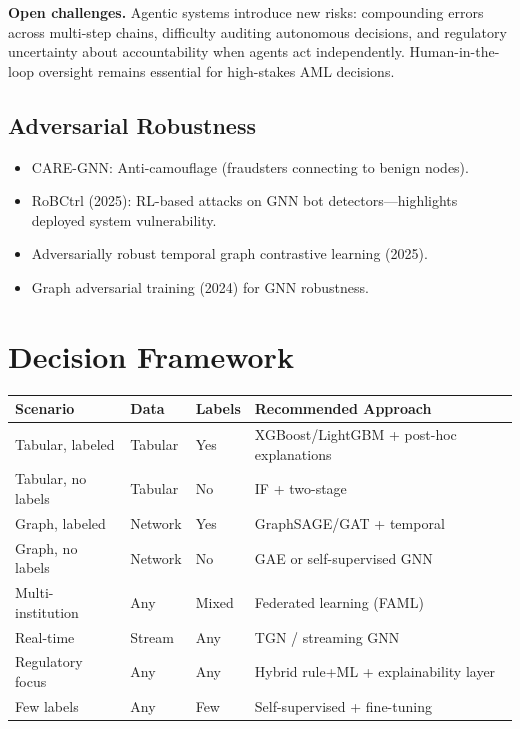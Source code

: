 \documentclass[11pt]{article}
\begin{document}
\textbf{Open challenges.} Agentic systems introduce new risks: compounding errors across multi-step chains, difficulty auditing autonomous decisions, and regulatory uncertainty about accountability when agents act independently. Human-in-the-loop oversight remains essential for high-stakes AML decisions.

\subsection{Adversarial Robustness}

\begin{itemize}
\item CARE-GNN: Anti-camouflage (fraudsters connecting to benign nodes).
\item RoBCtrl (2025): RL-based attacks on GNN bot detectors---highlights deployed system vulnerability.
\item Adversarially robust temporal graph contrastive learning (2025).
\item Graph adversarial training (2024) for GNN robustness.
\end{itemize}

\section{Decision Framework}

\begin{center}
\small
\begin{tabular}{p{3cm}llp{4.5cm}}
\toprule
\textbf{Scenario} & \textbf{Data} & \textbf{Labels} & \textbf{Recommended Approach} \\
\midrule
Tabular, labeled & Tabular & Yes & XGBoost/LightGBM + post-hoc explanations \\
Tabular, no labels & Tabular & No & IF + two-stage \\
Graph, labeled & Network & Yes & GraphSAGE/GAT + temporal \\
Graph, no labels & Network & No & GAE or self-supervised GNN \\
Multi-institution & Any & Mixed & Federated learning (FAML) \\
Real-time & Stream & Any & TGN / streaming GNN \\
Regulatory focus & Any & Any & Hybrid rule+ML + explainability layer \\
Few labels & Any & Few & Self-supervised + fine-tuning \\
\bottomrule
\end{tabular}
\end{center}
\end{document}
